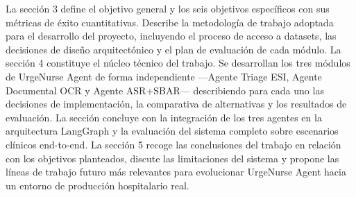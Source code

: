 La sección 3 define el objetivo general y los seis objetivos específicos con sus métricas de éxito cuantitativas. Describe la metodología de trabajo adoptada para el desarrollo del proyecto, incluyendo el proceso de acceso a datasets, las decisiones de diseño arquitectónico y el plan de evaluación de cada módulo.
La sección 4 constituye el núcleo técnico del trabajo. Se desarrollan los tres módulos de UrgeNurse Agent de forma independiente —Agente Triage ESI, Agente Documental OCR y Agente ASR+SBAR— describiendo para cada uno las decisiones de implementación, la comparativa de alternativas y los resultados de evaluación. La sección concluye con la integración de los tres agentes en la arquitectura LangGraph y la evaluación del sistema completo sobre escenarios clínicos end-to-end.
La sección 5 recoge las conclusiones del trabajo en relación con los objetivos planteados, discute las limitaciones del sistema y propone las líneas de trabajo futuro más relevantes para evolucionar UrgeNurse Agent hacia un entorno de producción hospitalario real.
